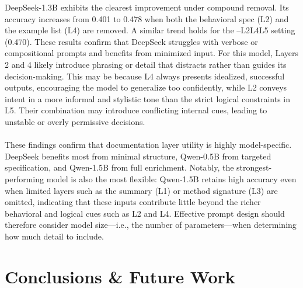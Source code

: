 \documentclass[a4paper]{usiinfbachelorproject}
\begin{document}
DeepSeek-1.3B exhibits the clearest improvement under compound removal. Its accuracy increases from 0.401 to 0.478 when both the behavioral spec (L2) and the example list (L4) are removed. A similar trend holds for the –L2L4L5 setting (0.470). These results confirm that DeepSeek struggles with verbose or compositional prompts and benefits from minimized input. For this model, Layers 2 and 4 likely introduce phrasing or detail that distracts rather than guides its decision-making. This may be because L4 always presents idealized, successful outputs, encouraging the model to generalize too confidently, while L2 conveys intent in a more informal and stylistic tone than the strict logical constraints in L5. Their combination may introduce conflicting internal cues, leading to unstable or overly permissive decisions. \\
\\
These findings confirm that documentation layer utility is highly model-specific. DeepSeek benefits most from minimal structure, Qwen-0.5B from targeted specification, and Qwen-1.5B from full enrichment. Notably, the strongest-performing model is also the most flexible: Qwen-1.5B retains high accuracy even when limited layers such as the summary (L1) or method signature (L3) are omitted, indicating that these inputs contribute little beyond the richer behavioral and logical cues such as L2 and L4. Effective prompt design should therefore consider model size—i.e., the number of parameters—when determining how much detail to include.

\section{Conclusions \& Future Work} \label{sec:concl}
\end{document}
